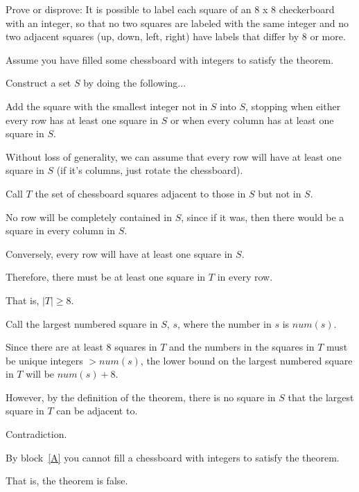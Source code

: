 \documentclass[11pt]{article}
\begin{document}
\begin{problems}


  \newpage

  \problem

  \begin{theorem}
      Prove or disprove: It is possible to label each square of an 8 x 8 checkerboard with an integer, 
      so that no two squares are labeled with the same integer and no two adjacent squares 
      (up, down, left, right) have labels that differ by 8 or more.
  \end{theorem}

  \smallskip

  \begin{longFormProof}

    \begin{block}[A]
      {Assume you have filled some chessboard with integers to satisfy the theorem.}

      \step Construct a set $S$ by doing the following...

      \step Add the square with the smallest integer not in $S$ into $S$, 
            stopping when either every row has at least one square in $S$ or when every column has at least one square in $S$.

      \step Without loss of generality, we can assume that every row will have at least one square in $S$ (if it's columns, just rotate the chessboard).

      \step Call $T$ the set of chessboard squares adjacent to those in $S$ but not in $S$.

      \step No row will be completely contained in $S$, since if it was, then there would be a square in every column in $S$.

      \step Conversely, every row will have at least one square in $S$.

      \step Therefore, there must be at least one square in $T$ in every row.

      \step That is, $|T| \geq 8$.

      \step Call the largest numbered square in $S$, $s$, where the number in $s$ is $num(s)$.

      \step Since there are at least $8$ squares in $T$ and the numbers in the squares in $T$ must be unique integers $> num(s)$, the lower bound on the largest numbered square in $T$ will be $num(s) + 8$.

      \step However, by the definition of the theorem, there is no square in $S$ that the largest square in $T$ can be adjacent to.

      \step Contradiction.

    \end{block}
    
    \step By block~\ref{A} you cannot fill a chessboard with integers to satisfy the theorem.

    \step That is, the theorem is false.
    
  \end{longFormProof}


\end{problems}
\end{document}
